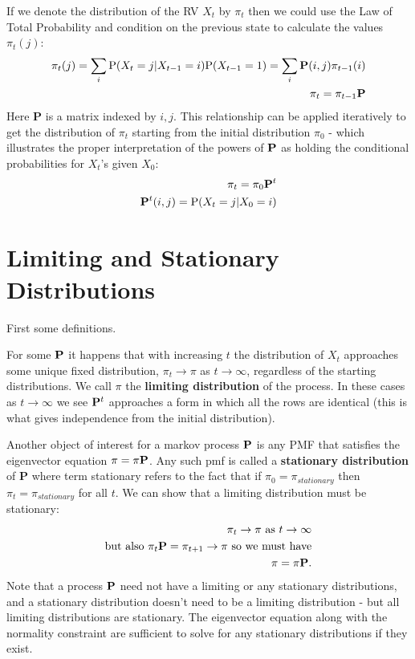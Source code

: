 If we denote the distribution of the RV $X_t$ by $\pi_t$ then we could use the Law of Total Probability and condition on the previous state to calculate the values $\pi_t(j)$:
\begin{align}
\pi_t(j) = \sum_i \mathrm{P}(X_t = j | X_{t-1} = i)\mathrm{P}(X_{t-1} = 1) = \sum_i \bold{P}(i,j)\pi_{t-1}(i)\\
\pi_t = \pi_{t-1}\bold{P}
\end{align}
Here $\mathbf{P}$ is a matrix indexed by $i, j$. This relationship can be applied iteratively to get the distribution of $\pi_t$ starting from the initial distribution $\pi_0$ - which illustrates the proper interpretation of the powers of $\bold{P}$ as holding the conditional probabilities for $X_t$'s given $X_0$:
\begin{align}
\pi_t = \pi_0\bold{P}^t\\
\bold{P}^t(i,j) = \mathrm{P}(X_t = j | X_0 = i)
\end{align}




\section{Limiting and Stationary Distributions}
First some definitions. \n

For some $\bold{P}$ it happens that with increasing $t$ the distribution of $X_t$ approaches some unique fixed distribution, $\pi_t \rightarrow \pi$ as $t \rightarrow \infty$, regardless of the starting distributions. We call $\pi$ the \textbf{limiting distribution} of the process. In these cases as $t \rightarrow \infty$ we see $\bold{P}^t$ approaches a form in which all the rows are identical (this is what gives independence from the initial distribution). 
\n

Another object of interest for a markov process $\bold{P}$ is any PMF that satisfies the  eigenvector equation $\pi = \pi \bold{P}$. Any such pmf is called a \textbf{stationary distribution} of \textbf{P} where term stationary refers to the fact that if $\pi_0 = \pi_{stationary}$ then $\pi_t = \pi_{stationary}$ for all $t$. We can show that a limiting distribution must be stationary:
\begin{align}
\pi_t \rightarrow \pi \textrm{ as } t \rightarrow \infty \\
\textrm{but also } \pi_t\bold{P} =\pi_{t+1} \rightarrow \pi \textrm{ so we must have}\\
\pi = \pi \bold{P}.
\end{align}
Note that a process $\bold{P}$ need not have a limiting or any stationary distributions, and a stationary distribution doesn't need to be a limiting distribution - but all limiting distributions are stationary. The eigenvector equation along with the normality constraint are sufficient to solve for any stationary distributions if they exist. 
\n


